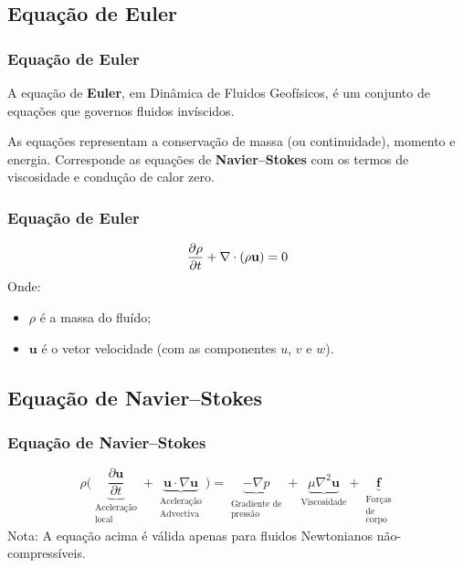 \subsection{Equação de Euler}
\begin{frame}
\frametitle{Equação de Euler}
  \begin{block}{}
    A equação de {\bf Euler}, em Dinâmica de Fluidos Geofísicos, é um conjunto de
    equações  que governos fluidos invíscidos.
  \end{block}

  \begin{block}{}
    As equações representam a conservação de massa (ou continuidade), momento
    e energia.  Corresponde as equações de {\bf Navier–Stokes} com os termos de
    viscosidade e condução de calor zero.
  \end{block}
\end{frame}

\begin{frame}
\frametitle{Equação de Euler}
\[
    {\partial \rho  \over \partial t}+\nabla \cdot (\rho {\mathbf  u})=0
\]
Onde:
    \begin{itemize}
      \item $\rho$ é a massa do fluído;
      \item ${\mathbf  u}$ é o vetor velocidade (com as componentes $u$, $v$
            e $w$).
    \end{itemize}
\end{frame}

\subsection{Equação de Navier–Stokes}
\begin{frame}
\frametitle{Equação de Navier–Stokes}
\[
\rho \Big(
\underbrace{\frac{\partial \mathbf{u}}{\partial t}}_{
\begin{smallmatrix}
  \text{Aceleração}\\
  \text{local}
\end{smallmatrix}} +
\underbrace{\mathbf{u} \cdot \nabla \mathbf{u}}_{
\begin{smallmatrix}
  \text{Aceleração} \\
  \text{Advectiva}
\end{smallmatrix}}\Big) =
\underbrace{-\nabla p}_{
\begin{smallmatrix}
  \text{Gradiente de} \\
  \text{pressão}
\end{smallmatrix}} +
\underbrace{\mu \nabla^2 \mathbf{u}}_{\text{Viscosidade}} +
\underbrace{\mathbf{f}}_{
\begin{smallmatrix}
  \text{Forças} \\
  \text{de} \\
  \text{corpo}
\end{smallmatrix}}
\]
Nota: A equação acima é válida apenas para fluidos Newtonianos
não-compressíveis.
\end{frame}

